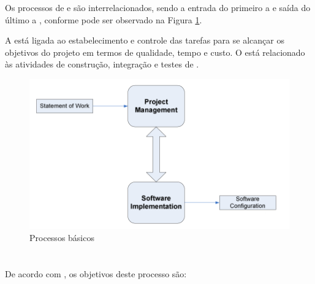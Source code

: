 Os processos de \gp e \dsw são interrelacionados, sendo a entrada do primeiro a \dt e saída do último a \swcfg, conforme pode ser observado na Figura \ref{fig:gp:dsw}. 

A \gp está ligada ao estabelecimento e controle das tarefas para se alcançar os objetivos do projeto em termos de qualidade, tempo e custo. O \dsw está relacionado às atividades de construção, integração e testes de \sw.

\begin{figure}[!h]
\centering
\includegraphics[scale=0.3]{figuras/gp_desenv_sw.png}
\caption{Processos básicos \cite[pág. 12]{iso}}
\label{fig:gp:dsw}
\end{figure}

\section{\gp}
\label{Sec:iso:obj:gp}

De acordo com \cite{iso}, os objetivos deste processo são:

